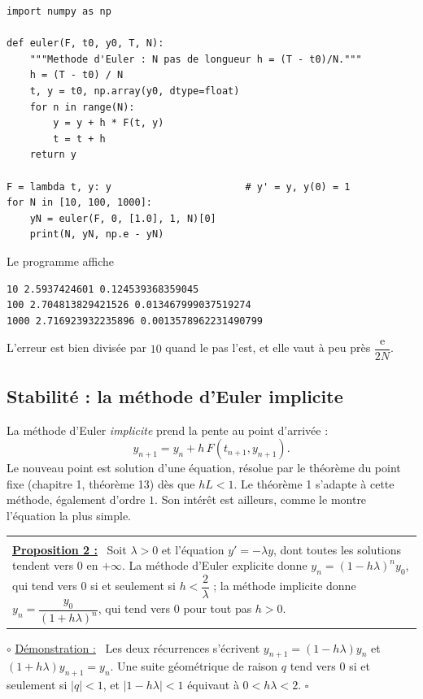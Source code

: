 \documentclass[a4paper,twoside]{report}
\makeatletter
\newenvironment{cadre}%
 {\par\vspace{2mm}\noindent\begin{tabular}{|@{\hspace{4mm}}p{0.93\textwidth}@{\hspace{4mm}}|}
  \hline \\[-2mm]}%
 {\\[2mm] \hline \end{tabular}\par\vspace{3mm}}
\newcommand{\propo}[1]{\textbf{\underline{Proposition #1 :}}~}
\newenvironment{demo}%
 {\par\needspace{4\baselineskip}\vspace{1mm}\noindent$\circ$ \underline{Démonstration :}~\setlength{\parskip}{3pt plus 1pt}}%
 {\hfill$\square$\par\vspace{2mm}}
\newcommand{\ee}{\mathrm{e}}                      %
\makeatother
\begin{document}
\begin{lstlisting}
import numpy as np

def euler(F, t0, y0, T, N):
    """Methode d'Euler : N pas de longueur h = (T - t0)/N."""
    h = (T - t0) / N
    t, y = t0, np.array(y0, dtype=float)
    for n in range(N):
        y = y + h * F(t, y)
        t = t + h
    return y

F = lambda t, y: y                       # y' = y, y(0) = 1
for N in [10, 100, 1000]:
    yN = euler(F, 0, [1.0], 1, N)[0]
    print(N, yN, np.e - yN)
\end{lstlisting}

\noindent Le programme affiche
\begin{verbatim}
10 2.5937424601 0.124539368359045
100 2.704813829421526 0.013467999037519274
1000 2.716923932235896 0.0013578962231490799
\end{verbatim}
\noindent L'erreur est bien divisée par $10$ quand le pas l'est, et elle vaut à peu près $\dfrac{\ee}{2N}$.

\subsection{Stabilité : la méthode d'Euler implicite}

La méthode d'Euler \emph{implicite} prend la pente au point d'arrivée :
\[ y_{n + 1} = y_{n} + h\,F(t_{n + 1}, y_{n + 1}). \]
Le nouveau point est solution d'une équation, résolue par le théorème du point fixe (chapitre 1, théorème 13) dès que $hL < 1$. Le théorème 1 s'adapte à cette méthode, également d'ordre $1$. Son intérêt est ailleurs, comme le montre l'équation la plus simple.

\begin{cadre}
\propo{2} Soit $\lambda > 0$ et l'équation $y' = -\lambda y$, dont toutes les solutions tendent vers $0$ en $+\infty$. La méthode d'Euler explicite donne $y_{n} = (1 - h\lambda)^{n}y_{0}$, qui tend vers $0$ si et seulement si $h < \dfrac{2}{\lambda}$ ; la méthode implicite donne $y_{n} = \dfrac{y_{0}}{(1 + h\lambda)^{n}}$, qui tend vers $0$ pour tout pas $h > 0$.
\end{cadre}

\begin{demo}
Les deux récurrences s'écrivent $y_{n + 1} = (1 - h\lambda)y_{n}$ et $(1 + h\lambda)y_{n + 1} = y_{n}$. Une suite géométrique de raison $q$ tend vers $0$ si et seulement si $|q| < 1$, et $|1 - h\lambda| < 1$ équivaut à $0 < h\lambda < 2$.
\end{demo}
\end{document}

